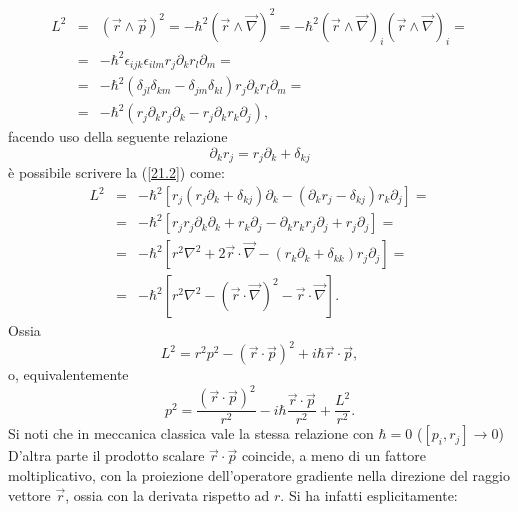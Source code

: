 \documentclass[a4paper,12pt,oneside]{book}
\begin{document}
\begin{eqnarray} 
\label{21.2}
L^2 & =&\left(\vec{r}\wedge\vec{p}\right)^2=-\hbar^2\left(\vec{r}\wedge\vec{\nabla}\right)^2=-\hbar^2\left(\vec{r}\wedge\vec{\nabla}\right)_i\left(\vec{r}\wedge\vec{\nabla}\right)_i= \nonumber \\
 & =& -\hbar^2\epsilon_{ijk}\epsilon_{ilm}r_j\partial_k r_l\partial_m= \nonumber \\
 & =&-\hbar^2\left(\delta_{jl}\delta_{km}-\delta_{jm}\delta_{kl}\right)r_j\partial_k r_l\partial_m=\nonumber \\
 & =&-\hbar^2\left(r_j\partial_kr_j\partial_k-r_j\partial_kr_k\partial_j\right) ,
\end{eqnarray}
facendo uso della seguente relazione
\begin{equation}
\partial_kr_j=r_j\partial_k+\delta_{kj}
\end{equation}
è possibile scrivere la (\ref{21.2}) come:
\begin{eqnarray}
L^2&=&-\hbar^2\left[r_j\left(r_j\partial_k+\delta_{kj}\right)\partial_k-\left(\partial_kr_j-\delta_{kj}\right)r_k\partial_j\right]= \nonumber\\
&=&-\hbar^2\left[r_jr_j\partial_k\partial_k+r_k\partial_j-\partial_kr_kr_j\partial_j+r_j\partial_j\right]= \nonumber \\
&=&-\hbar^2\left[r^2\nabla^2+2\vec{r}\cdot\vec{\nabla}-\left(r_k\partial_k+\delta_{kk}\right)r_j\partial_j\right]= \nonumber\\
&=&-\hbar^2\left[r^2\nabla^2-\left(\vec{r}\cdot\vec{\nabla}\right)^2-\vec{r}\cdot\vec{\nabla}\right].
\end{eqnarray}
Ossia
\begin{equation}
L^2=r^2p^2-\left(\vec{r}\cdot\vec{p}\right)^2+i\hbar\vec{r}\cdot\vec{p} ,
\end{equation}
o, equivalentemente
\begin{equation}
\label{21.3}
p^2=\frac{\left(\vec{r}\cdot\vec{p}\right)^2}{r^2}-i\hbar\frac{\vec{r}\cdot\vec{p}}{r^2}+\frac{L^2}{r^2}.
\end{equation}
Si noti che in meccanica classica vale la stessa relazione con $\hbar=0$ ($\left[p_i,r_j\right]\rightarrow0$)\\
D'altra parte il prodotto scalare $\vec{r}\cdot\vec{p}$ coincide, a meno di un fattore moltiplicativo, con la proiezione dell'operatore gradiente nella direzione del raggio vettore $\vec{r}$, ossia con la derivata rispetto ad $r$. Si ha infatti esplicitamente:
\end{document}
